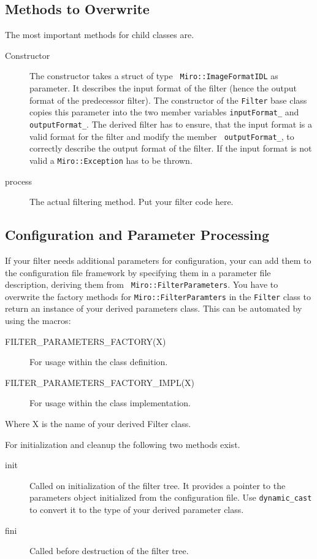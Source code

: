 \subsection{Methods to Overwrite}

The most important methods for child classes are.
\begin{description}
\item[Constructor] The constructor takes a struct of type {\tt
    Miro::ImageFormatIDL} as parameter. It describes the input format
  of the filter (hence the output format of the predecessor filter).
  The constructor of the {\tt Filter} base class copies this parameter
  into the two member variables {\tt inputFormat\_} and {\tt
    outputFormat\_}. The derived filter has to ensure, that the input
  format is a valid format for the filter and modify the member {\tt
    outputFormat\_}, to correctly describe the output format of the
  filter. If the input format is not valid a {\tt Miro::Exception} has
  to be thrown.
\item[process] The actual filtering method. Put your filter code here.
\end{description}

\subsection{Configuration and Parameter Processing}

If your filter needs additional parameters for configuration, your can
add them to the configuration file framework by specifying them in a
parameter file description, deriving them from {\tt
  Miro::FilterParameters}. You have to overwrite the factory methods
for {\tt Miro::FilterParamters} in the {\tt Filter} class to return an
instance of your derived parameters class. This can be automated by
using the macros:
\begin{description}
\item[FILTER\_PARAMETERS\_FACTORY(X)] For usage within the class definition.
\item[FILTER\_PARAMETERS\_FACTORY\_IMPL(X)] For usage within the class implementation.
\end{description}
Where X is the name of your derived Filter class. 

For initialization and cleanup the following two methods exist.
\begin{description}
\item[init] Called on initialization of the filter tree. It provides a
  pointer to the parameters object initialized from the configuration
  file. Use {\tt dynamic\_cast} to convert it to the type of your
  derived parameter class.
\item[fini] Called before destruction of the filter tree.
\end{description}

